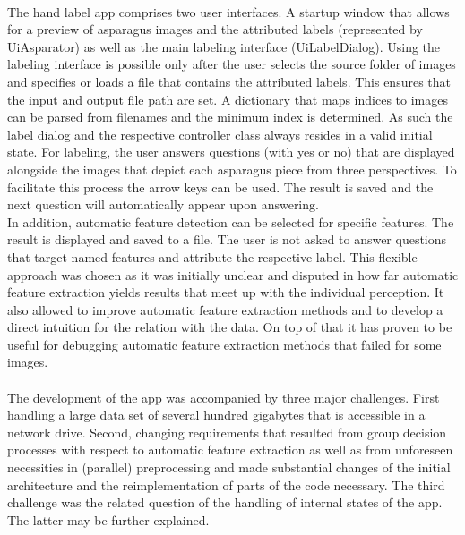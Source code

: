 \\
The hand label app comprises two user interfaces. A startup window that allows for a preview of asparagus images and the attributed labels (represented by Ui\textunderscore Asparator) as well as the main labeling interface (Ui\textunderscore LabelDialog). Using the labeling interface is possible only after the user selects the source folder of images and specifies or loads a file that contains the attributed labels. This ensures that the input and output file path are set. A dictionary that maps indices to images can be parsed from filenames and the minimum index is determined. As such the label dialog and the respective controller class always resides in a valid initial state. For labeling, the user answers questions (with yes or no) that are displayed alongside the images that depict each asparagus piece from three perspectives. To facilitate this process the arrow keys can be used. The result is saved and the next question will automatically appear upon answering. \\
In addition, automatic feature detection can be selected for specific features. The result is displayed and saved to a file. The user is not asked to answer questions that target named features and attribute the respective label. This flexible approach was chosen as it was initially unclear and disputed in how far automatic feature extraction yields results that meet up with the individual perception. It also allowed to improve automatic feature extraction methods and to develop a direct intuition for the relation with the data. On top of that it has proven to be useful for debugging automatic feature extraction methods that failed for some images. \\
\\
The development of the app was accompanied by three major challenges. First handling a large data set of several hundred gigabytes that is accessible in a network drive. Second, changing requirements that resulted from group decision processes with respect to automatic feature extraction as well as from unforeseen necessities in (parallel) preprocessing and made substantial changes of the initial architecture and the reimplementation of parts of the code necessary. The third challenge was the related question of the handling of internal states of the app. The latter may be further explained. \\
\\
